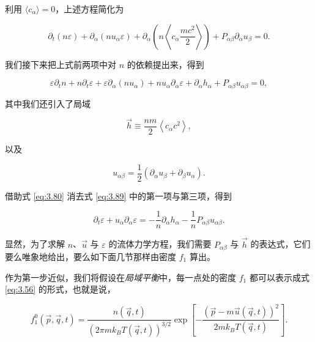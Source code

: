 利用 $\langle c_\alpha\rangle=0$，上述方程简化为

\begin{equation}\label{eq:3.88}
  \partial_t(n\varepsilon)+\partial_\alpha(nu_\alpha\varepsilon)+\partial_\alpha\left(n\left\langle c_\alpha\frac{mc^2}{2}\right\rangle\right)+P_{\alpha\beta}\partial_\alpha u_\beta=0.
\end{equation}

我们接下来把上式前两项中对 $n$ 的依赖提出来，得到

\begin{equation}\label{eq:3.89}
  \varepsilon\partial_t n+n\partial_t\varepsilon+\varepsilon\partial_\alpha(nu_\alpha)+nu_\alpha\partial_\alpha\varepsilon+\partial_\alpha h_\alpha+P_{\alpha\beta}u_{\alpha\beta}=0,
\end{equation}

其中我们还引入了局域

\begin{equation}\label{eq:3.90}
  \vec h\equiv\frac{nm}{2}\left\langle c_\alpha c^2\right\rangle,
\end{equation}

以及

\begin{equation}\label{eq:3.91}
  u_{\alpha\beta}=\frac{1}{2}\left(\partial_\alpha u_\beta+\partial_\beta u_\alpha\right).
\end{equation}

借助式 \eqref{eq:3.80} 消去式 \eqref{eq:3.89} 中的第一项与第三项，得到

\begin{equation}\label{eq:3.92}
  \partial_t\varepsilon+u_\alpha\partial_\alpha\varepsilon=-\frac{1}{n}\partial_\alpha h_\alpha-\frac{1}{n}P_{\alpha\beta}u_{\alpha\beta}.
\end{equation}

显然，为了求解 $n$、$\vec u$ 与 $\varepsilon$ 的流体力学方程，我们需要 $P_{\alpha\beta}$ 与 $\vec h$ 的表达式，它们要么唯象地给出，要么如下面几节那样由密度 $f_1$ 算出。


作为第一步近似，我们将假设在\emph{局域平衡}中，每一点处的密度 $f_1$ 都可以表示成式 \eqref{eq:3.56} 的形式，也就是说，

\begin{equation}\label{eq:3.93}
  f_1^0(\vec p,\vec q,t)=\frac{n(\vec q,t)}{\left(2\pi mk_BT(\vec q,t)\right)^{3/2}}\exp\left[-\frac{\left(\vec p-m\vec u(\vec q,t)\right)^2}{2mk_BT(\vec q,t)}\right].
\end{equation}

